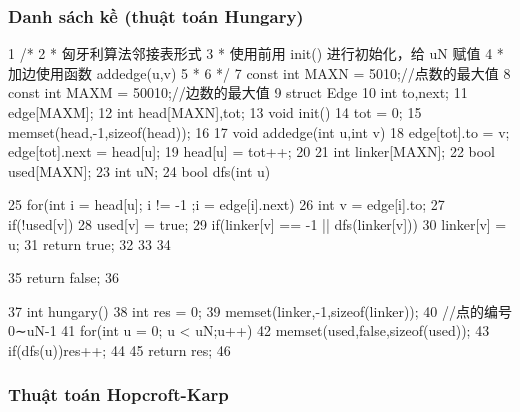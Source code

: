 \documentclass[11pt]{article}
\begin{document}
\subsubsection{Danh sách kề (thuật toán Hungary)}

\begin{Code}
 1   /*
 2    * 匈牙利算法邻接表形式
 3    * 使用前用 init() 进行初始化，给 uN 赋值
 4    * 加边使用函数 addedge(u,v)
 5    *
 6    */
 7   const int MAXN = 5010;//点数的最大值
 8   const int MAXM = 50010;//边数的最大值
 9   struct Edge{
10       int to,next;
11   }edge[MAXM];
12   int head[MAXN],tot;
13   void init(){
14       tot = 0;
15       memset(head,-1,sizeof(head));
16   }
17   void addedge(int u,int v){
18       edge[tot].to = v; edge[tot].next = head[u];
19       head[u] = tot++;
20   }
21   int linker[MAXN];
22   bool used[MAXN];
23   int uN;
24   bool dfs(int u){
25       for(int i = head[u]; i != -1 ;i = edge[i].next){
26           int v = edge[i].to;
27           if(!used[v]){
28                used[v] = true;
29                if(linker[v] == -1 || dfs(linker[v])){
30                    linker[v] = u;
31                    return true;
32                }
33           }
34       }


35     return false;
36 }
37 int hungary(){
38     int res = 0;
39     memset(linker,-1,sizeof(linker));
40     //点的编号 0∼uN-1
41     for(int u = 0; u < uN;u++){
42         memset(used,false,sizeof(used));
43         if(dfs(u))res++;
44     }
45     return res;
46 }
\end{Code}

\subsubsection{Thuật toán Hopcroft-Karp}
\end{document}
